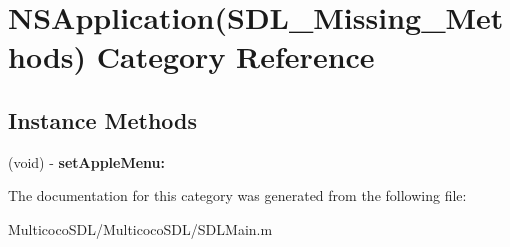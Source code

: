 \hypertarget{category_n_s_application_07_s_d_l___missing___methods_08}{\section{N\-S\-Application(S\-D\-L\-\_\-\-Missing\-\_\-\-Methods) Category Reference}
\label{category_n_s_application_07_s_d_l___missing___methods_08}
}
\subsection*{Instance Methods}
\begin{DoxyCompactItemize}
\item 
\hypertarget{category_n_s_application_07_s_d_l___missing___methods_08_abc77a503ce35ae00353bc65f8d3f3f3e}{(void) -\/ {\bfseries set\-Apple\-Menu\-:}}\label{category_n_s_application_07_s_d_l___missing___methods_08_abc77a503ce35ae00353bc65f8d3f3f3e}

\end{DoxyCompactItemize}


The documentation for this category was generated from the following file\-:\begin{DoxyCompactItemize}
\item 
Multicoco\-S\-D\-L/\-Multicoco\-S\-D\-L/S\-D\-L\-Main.\-m\end{DoxyCompactItemize}
